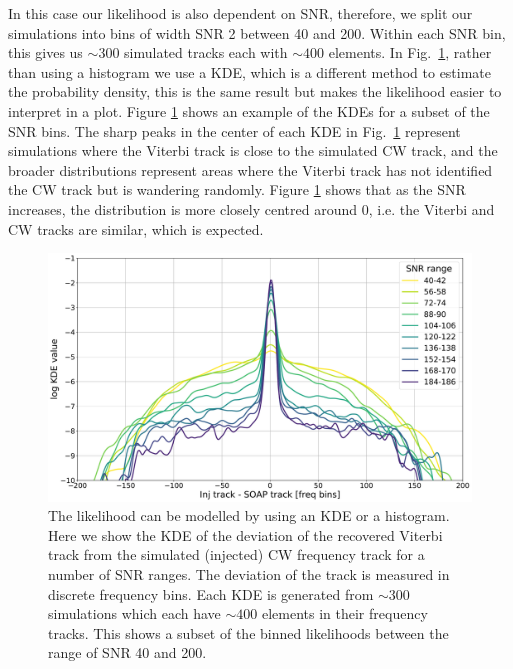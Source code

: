 In this case our likelihood is also dependent on \gls{SNR}, therefore, we split
our simulations into bins of width \gls{SNR} 2 between 40 and 200. Within each
\gls{SNR} bin, this gives us $\sim 300$ simulated tracks each with $\sim 400$
elements.  In Fig.~\ref{par_est:bayes:likelihood:kde142}, rather than using a histogram we use a \gls{KDE}, which is a different method to estimate the probability density, this is the same result but makes the likelihood easier to interpret in a plot. Figure \ref{par_est:bayes:likelihood:kde142} shows an example of the \glspl{KDE} for a subset of the \gls{SNR} bins. The sharp peaks in the center of
each \gls{KDE} in Fig.~\ref{par_est:bayes:likelihood:kde142} represent
simulations where the Viterbi track is close to the simulated \gls{CW} track,
and the broader distributions represent areas where the Viterbi track has not
identified the \gls{CW} track but is wandering randomly.
Figure \ref{par_est:bayes:likelihood:kde142} shows that as the \gls{SNR}
increases, the distribution is more closely centred around 0, i.e. the Viterbi
and \gls{CW} tracks are similar, which is expected.

%
\begin{figure}[ht]
    \centering
    \includegraphics[width=\linewidth]{C5_parameter/KDE_range_40_200.pdf}
    \caption[KDE of likelihood in different \gls{SNR} ranges]{The likelihood can be modelled by using an \gls{KDE} or a histogram. Here we show the \gls{KDE} of the deviation of the recovered Viterbi track from
the simulated (injected) \gls{CW} frequency track for a number of \gls{SNR} ranges. The deviation of the track is
measured in discrete frequency bins. Each \gls{KDE} is generated from $\sim
300$ simulations which each have $\sim 400$ elements in their frequency tracks.
This shows a subset of the binned likelihoods between the range of \gls{SNR} 40
and 200.} \label{par_est:bayes:likelihood:kde142}
    \end{figure}
%

